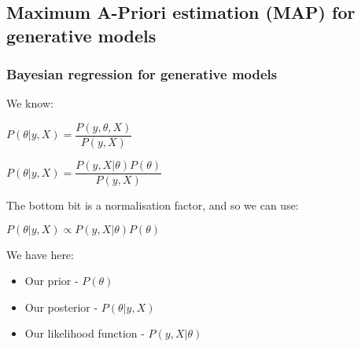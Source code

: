 
\subsection{Maximum A-Priori estimation (MAP) for generative models}

\subsubsection{Bayesian regression for generative models}

We know:

\(P(\theta |y,X)=\dfrac{P(y, \theta, X )}{P(y, X)}\)

\(P(\theta |y,X)=\dfrac{P(y, X |\theta )P(\theta )}{P(y, X)}\)

The bottom bit is a normalisation factor, and so we can use:

\(P(\theta |y,X)\propto P(y, X| \theta)P(\theta)\)

We have here:

\begin{itemize}
\item Our prior - \(P(\theta )\)
\item Our posterior - \(P(\theta |y,X)\)
\item Our likelihood function - \(P(y, X| \theta )\)
\end{itemize}


